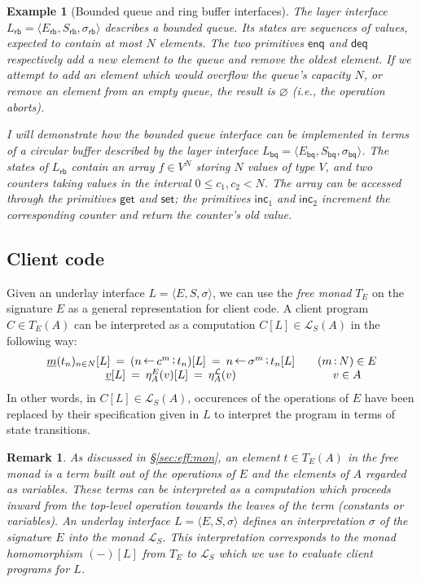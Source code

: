 \documentclass[11pt,oneside,draft]{book}
\newtheorem{example}[theorem]{Example}
\newtheorem{remark}[theorem]{Remark}
\theoremstyle{definition}
\newcommand{\kw}[1]{\ensuremath{ \mathsf{#1} }}
\newcommand{\ul}[1]{%
  \underline{\smash{#1}}
}
\begin{document}
\begin{example}[Bounded queue and ring buffer interfaces] %
The layer interface
$L_\kw{rb} = \langle E_\kw{rb}, S_\kw{rb}, \sigma_\kw{rb} \rangle$
describes a bounded queue.
Its states are sequences of values,
expected to contain at most $N$ elements.
The two primitives
$\kw{enq}$ and $\kw{deq}$
respectively add a new element to the queue
and remove the oldest element.
If we attempt to add an element
which would overflow the queue's capacity $N$,
or remove an element from an empty queue,
the result is $\varnothing$ (i.e., the operation aborts).

I will demonstrate how the bounded queue interface
can be implemented in terms of a circular buffer
described by the layer interface
$L_\kw{bq} = \langle E_\kw{bq}, S_\kw{bq}, \sigma_\kw{bq} \rangle$.
The states of $L_\kw{rb}$
contain an array $f \in V^N$
storing $N$ values of type $V$,
and two counters
taking values in the interval $0 \le c_1, c_2 < N$.
The array can be accessed through the primitives
$\kw{get}$ and $\kw{set}$;
the primitives $\kw{inc}_1$ and $\kw{inc}_2$
increment the corresponding counter
and return the counter's old value.
\end{example}


\subsection{Client code} %

Given an underlay interface $L = \langle E, S, \sigma \rangle$,
we can use the \emph{free monad} $T_E$ on the signature $E$
as a general representation for client code.
A client program $C \in T_E(A)$
can be interpreted as
a computation $C[L] \in \mathcal{L}_S(A)$ in the following way:
\[
  \begin{array}{c@{\qquad}c}
    \ul{m}(t_n)_{n \in N}[L] \: = \:
      (n \mathop\leftarrow c^m \mathop; t_n)[L] \: = \:
      n \mathop\leftarrow \sigma^m \mathop; t_n[L] &
      (m \mathop: N) \in E \\
    \ul{v}[L] \: = \:
      \eta^E_A(v)[L] \: = \:
      \eta^\mathcal{L}_A(v) &
      v \in A
  \end{array}
\]
In other words, in $C[L] \in \mathcal{L}_S(A)$,
occurences of the operations of $E$
have been replaced by their specification given in $L$
to interpret the program in terms of state transitions.

\begin{remark}
As discussed in \S\ref{sec:eff:mon},
an element $t \in T_E(A)$ in the free monad
is a term built out of the operations of $E$ and
the elements of $A$ regarded as variables.
These terms can be interpreted as a computation which proceeds inward
from the top-level operation
towards the leaves of the term (constants or variables).
An underlay interface $L = \langle E, S, \sigma \rangle$
defines an interpretation $\sigma$
of the signature $E$ into the monad $\mathcal{L}_S$.
This interpretation corresponds to
the monad homomorphism $(-)[L]$ from $T_E$ to $\mathcal{L}_S$
which we use to evaluate client programs for $L$.
\end{remark}
\end{document}
